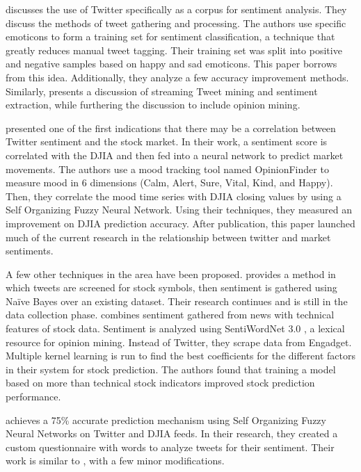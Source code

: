 \documentclass[preprint,pre,floats,aps,amsmath,amssymb,12pt]{revtex4}
\begin{document}
\cite{Pak} discusses the use of Twitter specifically as a corpus for sentiment analysis. They discuss the methods of tweet gathering and processing. The authors use specific emoticons to form a training set for sentiment classification, a technique that greatly reduces manual tweet tagging. Their training set was split into positive and negative samples based on happy and sad emoticons. This paper borrows from this idea. Additionally, they analyze a few accuracy improvement methods. Similarly, \cite{Bifet} presents a discussion of streaming Tweet mining and sentiment extraction, while furthering the discussion to include opinion mining. 

\cite{Bollen} presented one of the first indications that there may be a correlation between Twitter sentiment and the stock market. In their work, a sentiment score is correlated with the DJIA and then fed into a neural network to predict market movements. The authors use a mood tracking tool named OpinionFinder to measure mood in 6 dimensions (Calm, Alert, Sure, Vital, Kind, and Happy). Then, they correlate the mood time series with DJIA closing values by using a Self Organizing Fuzzy Neural Network. Using their techniques, they measured an improvement on DJIA prediction accuracy. After publication, this paper launched much of the current research in the relationship between twitter and market sentiments. 

A few other techniques in the area have been proposed. \citep{Brown} provides a method in which tweets are screened for stock symbols, then sentiment is gathered using Naïve Bayes over an existing dataset. Their research continues and is still in the data collection phase. \cite{Shangkun} combines sentiment gathered from news with technical features of stock data. Sentiment is analyzed using SentiWordNet 3.0 \cite{SWN}, a lexical resource for opinion mining. Instead of Twitter, they scrape data from Engadget. Multiple kernel learning is run to find the best coefficients for the different factors in their system for stock prediction. The authors found that training a model based on more than technical stock indicators improved stock prediction performance. 

\cite{Mittal} achieves a 75\% accurate prediction mechanism using Self Organizing Fuzzy Neural Networks on Twitter and DJIA feeds. In their research, they created a custom questionnaire with words to analyze tweets for their sentiment. Their work is similar to \cite{Bollen}, with a few minor modifications.
\end{document}
